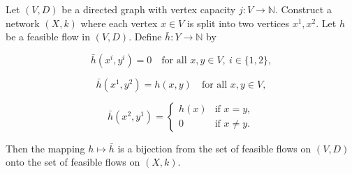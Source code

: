 Let $(V, D)$ be a directed graph with vertex capacity $j: V \to \mathbb{N}$. Construct a network $(X, k)$ where each vertex $x \in V$ is split into two vertices $x^1, x^2$. Let $h$ be a feasible flow in $(V, D)$. Define $\bar{h}: Y \to \mathbb{N}$ by

$$\bar{h}(x^i, y^i) = 0 \quad \text{for all } x, y \in V,\ i \in \{1, 2\},$$

$$\bar{h}(x^1, y^2) = h(x, y) \quad \text{for all } x, y \in V,$$

$$\bar{h}(x^2, y^1) = \begin{cases} h(x) & \text{if } x = y, \\ 0 & \text{if } x \neq y. \end{cases}$$

Then the mapping $h \mapsto \bar{h}$ is a bijection from the set of feasible flows on $(V, D)$ onto the set of feasible flows on $(X, k)$.
